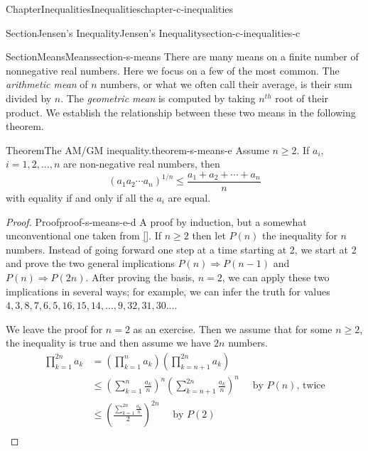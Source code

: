 \documentclass[oneside,10pt,]{book}
\newcommand{\xreffont}{\relax}
\numberwithin{equation}{section}
\begin{document}
\begin{chapterptx}{Chapter}{Inequalities}{}{Inequalities}{}{}{chapter-c-inequalities}
\begin{sectionptx}{Section}{Jensen's Inequality}{}{Jensen's Inequality}{}{}{section-c-inequalities-c}
\end{sectionptx}
%
%
\typeout{************************************************}
\typeout{************************************************}
%
\begin{sectionptx}{Section}{Means}{}{Means}{}{}{section-s-means}
%
%
There are many means on a finite number of nonnegative real numbers.  Here we focus on a few of the most common.  The \emph{arithmetic mean} of \(n\) numbers, or what we often call their average, is their sum divided by \(n\).  The \emph{geometric mean} is computed by taking \(n^{th}\) root of their product.  We establish the relationship between these two means in the following theorem.%
\begin{theorem}{Theorem}{The AM\slash{}GM inequality.}{}{theorem-s-means-e}%
%
Assume \(n \geq 2\).  If \(a_i\), \(i = 1, 2, \dots, n\) are non-negative real numbers, then%
\begin{equation*}
\left(a_1 a_2\cdots  a_n\right)^{1/n}\leq  \frac{a_1+a_2+\cdots +a_n}{n}
\end{equation*}
with equality if and only if all the \(a_i\) are equal.%
\end{theorem}
\begin{proof}{Proof}{}{proof-s-means-e-d}
A proof by induction, but a somewhat unconventional one taken from \hyperlink{biblio-biblio-aigner}{[{\xreffont 1}]}. If \(n \ge 2\) then let \(P(n)\) the inequality for \(n\) numbers.  Instead of going forward one step at a time starting at 2, we start at 2 and prove the two general implications  \(P(n)\Rightarrow P(n-1)\)  and \(P(n)\Rightarrow P(2n)\).  After proving the basis, \(n=2\), we can apply these two implications in several ways; for example, we can infer the truth for values \(4, 3, 8, 7, 6, 5, 16, 15, 14, \dots, 9, 32, 31, 30 \dots\).%
\par
We leave the proof for \(n=2\) as an exercise.  Then we assume that for some \(n \geq 2\), the inequality is true and then assume we have \(2n\) numbers.%
\begin{equation*}
\begin{split}
\prod_{k=1}^{2n} a_k &=\left(\prod_{k=1}^{n} a_k \right)\left(\prod_{k=n+1}^{2n} a_k  \right) \\	
& \leq \left(\sum_{k=1}^{n} \frac{a_k}{n} \right)^n \left(\sum_{k=n+1}^{2n} \frac{a_k}{n} \right)^n \quad \textrm{ by }P(n)\textrm{, twice}\\
& \leq \left(\frac{\sum_{k=1}^{2n} \frac{a_k}{n}}{2}\right)^{2n} \quad \textrm{ by }P(2)\\

\end{split}
\end{equation*}
\end{proof}
\end{sectionptx}
\end{chapterptx}
\end{document}
